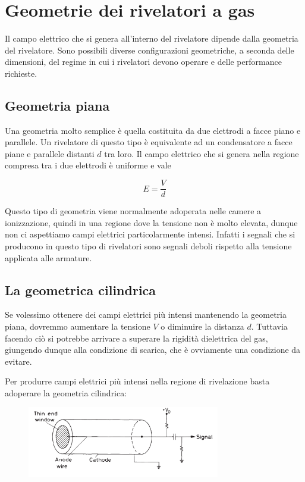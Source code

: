 \section{Geometrie dei rivelatori a gas}

Il campo elettrico che si genera all'interno del rivelatore dipende dalla geometria del rivelatore. Sono possibili diverse configurazioni geometriche, a seconda delle dimensioni, del regime in cui i rivelatori devono operare e delle performance richieste.

\subsection{Geometria piana}
Una geometria molto semplice è quella costituita da due elettrodi a facce piano e parallele. Un rivelatore di questo tipo è equivalente ad un condensatore a facce piane e parallele distanti $d$ tra loro. Il campo elettrico che si genera nella regione compresa tra i due elettrodi è uniforme e vale

\begin{equation*}
   E=\frac{V}{d}
\end{equation*}

Questo tipo di geometria viene normalmente adoperata nelle camere a ionizzazione, quindi in una regione dove la tensione non è molto elevata, dunque non ci aspettiamo campi elettrici particolarmente intensi. Infatti i segnali che si producono in questo tipo di rivelatori sono segnali deboli rispetto alla tensione applicata alle armature.

\subsection{La geometrica cilindrica}
Se volessimo ottenere dei campi elettrici più intensi mantenendo la geometria piana, dovremmo aumentare la tensione $V$ o diminuire la distanza $d$. Tuttavia facendo ciò si potrebbe arrivare a superare la rigidità dielettrica del gas, giungendo dunque alla condizione di scarica, che è ovviamente una condizione da evitare.

Per produrre campi elettrici più intensi nella regione di rivelazione basta adoperare la geometria cilindrica:

\begin{figure}[H]
   \centering
   \includegraphics[width=0.75\textwidth]{immagini/geometria_cilindrica.png}
\end{figure}

